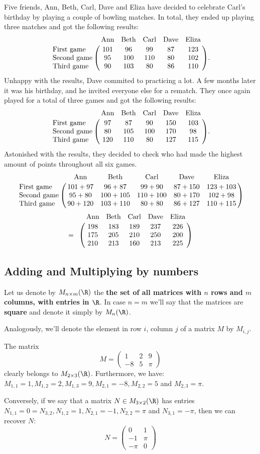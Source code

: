 \begin{ex}
	Five friends, Ann, Beth, Carl, Dave and Eliza have decided to celebrate Carl's birthday by playing a couple of bowling matches. In total, they ended up playing three matches and got the following results:
	\[\bordermatrix{
	&\text{Ann} & \text{Beth} & \text{Carl} & \text{Dave} &\text{Eliza}\cr
	\text{First game} & 101 & 96 & 99 & 87 & 123\cr
	\text{Second game} & 95 & 100 & 110 & 80 & 102\cr
	\text{Third game} & 90 & 103 & 80 & 86 & 110}.\]Unhappy with the results, Dave commited to practicing a lot. A few months later it was his birthday, and he invited everyone else for a rematch. They once again played for a total of three games and got the following results:
	\[\bordermatrix{
		&\text{Ann} & \text{Beth} & \text{Carl} & \text{Dave} &\text{Eliza}\cr
		\text{First game} & 97 & 87 & 90 & 150 & 103\cr
		\text{Second game} & 80 & 105 & 100 & 170 & 98\cr
		\text{Third game} & 120 & 110 & 80 & 127 & 115}.\] Astonished with the results, they decided to check who had made the highest amount of points throughout all six games.
	\[\bordermatrix{
		&\text{Ann} & \text{Beth} & \text{Carl} & \text{Dave} &\text{Eliza}\cr
		\text{First game} & 101+97 & 96+87 & 99+90 & 87+150 & 123+103\cr
		\text{Second game} & 95+80 & 100+105 & 110+100 & 80+170 & 102+98\cr
		\text{Third game} & 90+120 & 103+110 & 80+80 & 86+127 & 110+115}\]\[=\bordermatrix{
		&\text{Ann} & \text{Beth} & \text{Carl} & \text{Dave} &\text{Eliza}\cr
		 & 198 & 183 & 189 & 237 & 226\cr
		 & 175 & 205 & 210 & 250 & 200\cr
		 & 210 & 213 & 160 & 213 & 225}\]
\end{ex}

\subsection{Adding and Multiplying by numbers}

\begin{df}
	Let us denote by $M_{n\times m}(\R)$ the \textbf{the set of all matrices with $n$ rows and $m$ columns, with entries in $\R$}. In case $n=m$ we'll say that the matrices are \textbf{square} and denote it simply by $M_n(\R)$.
	
	Analogously, we'll denote the element in row $i$, column $j$ of a matrix $M$ by $M_{i,j}$.
\end{df}

\begin{ex}
	The matrix \[M=\begin{pmatrix}
	1 & 2 & 9\\
	-8 & 5 & \pi
	\end{pmatrix}\]clearly belongs to $M_{2\times 3}(\R)$. Furthermore, we have: $M_{1,1}=1,M_{1,2}=2,M_{1,3}=9,M_{2,1}=-8,M_{2,2}=5$ and $M_{2,3}=\pi$.
	
	\bigskip
	Conversely, if we say that a matrix $N\in M_{3\times 2}(\R)$ has entries $N_{1,1}=0=N_{3,2},N_{1,2}=1,N_{2,1}=-1,N_{2,2}=\pi$ and $N_{3,1}=-\pi$, then we can recover $N$:
	\[N=\begin{pmatrix}
	0 & 1\\
	-1 & \pi\\
	-\pi &0
	\end{pmatrix}\]
\end{ex}


